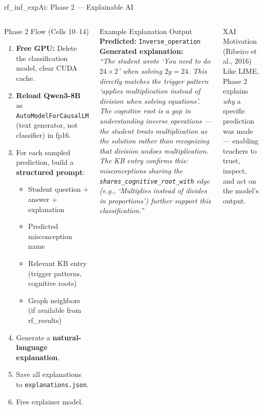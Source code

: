 ﻿\documentclass[aspectratio=169,10pt]{beamer}
\begin{document}
\begin{frame}[shrink=5]{rf\_inf\_expAi: Phase 2 --- Explainable AI}
\begin{columns}[T]
\begin{block}{Phase 2 Flow (Cells 10--14)}
\begin{enumerate}
  \item \textbf{Free GPU:} Delete the classification model, clear CUDA cache.
  \item \textbf{Reload Qwen3-8B} as \texttt{AutoModelForCausalLM} (text generator, not classifier) in fp16.
  \item For each sampled prediction, build a \textbf{structured prompt}:
  \begin{itemize}
    \item Student question + answer + explanation
    \item Predicted misconception name
    \item Relevant KB entry (trigger patterns, cognitive roots)
    \item Graph neighbors (if available from rf\_results)
  \end{itemize}
  \item Generate a \textbf{natural-language explanation}.
  \item Save all explanations to \texttt{explanations.json}.
  \item Free explainer model.
\end{enumerate}
\end{block}
\begin{exampleblock}{Example Explanation Output}
\scriptsize
\textbf{Predicted:} \texttt{Inverse\_operation}\\[4pt]
\textbf{Generated explanation:}\\
\textit{``The student wrote `You need to do $24 \times 2$' when solving $2y=24$. This directly matches the trigger pattern `applies multiplication instead of division when solving equations'. The cognitive root is a gap in understanding inverse operations --- the student treats multiplication as the solution rather than recognizing that division undoes multiplication. The KB entry confirms this: misconceptions sharing the \texttt{shares\_cognitive\_root\_with} edge (e.g., `Multiplies instead of divides in proportions') further support this classification.''}
\end{exampleblock}
\vspace{6pt}
\begin{block}{XAI Motivation (Ribeiro et al., 2016)}
Like LIME, Phase 2 explains \textit{why} a specific prediction was made --- enabling teachers to trust, inspect, and act on the model's output.
\end{block}
\end{columns}
\end{frame}
\end{document}
